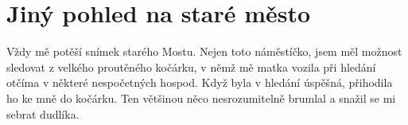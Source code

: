 
\chapter{Jiný pohled na staré město}

Vždy mě potěší snímek starého Mostu. Nejen toto náměstíčko, jsem měl možnost
sledovat z velkého proutěného kočárku, v němž mě matka vozila při hledání
otčíma v některé nespočetných hospod. Když byla v hledání úspěšná, přihodila ho
ke mně do kočárku. Ten většinou něco nesrozumitelně brumlal a snažil se mi
sebrat dudlíka.

